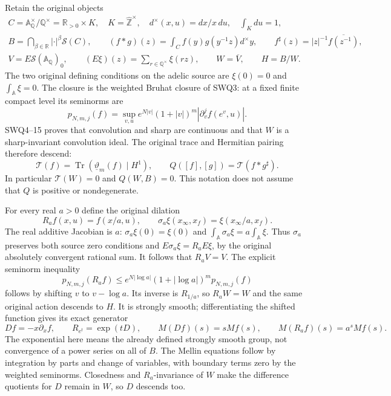 Retain the original objects
\begin{equation}\tag{GDT1}
 \begin{gathered}
 C=\mathbb A_{\mathbb Q}^{\times}/\mathbb Q^{\times}
   =\mathbb R_{>0}\times K,\quad K=\widehat{\mathbb Z}^{\times},
 \quad d^\times(x,u)=dx/x\,du,\quad\int_Kdu=1,\\
 B=\bigcap_{\beta\in\mathbb R}|\cdot|^\beta\mathcal S(C),\qquad
 (f*g)(z)=\int_C f(y)g(y^{-1}z)d^\times y,\qquad
 f^\sharp(z)=|z|^{-1}\overline{f(z^{-1})},\\
 V=E\mathcal S(\mathbb A_{\mathbb Q})_0,\qquad
 (E\xi)(z)=\sum_{r\in\mathbb Q^\times}\xi(rz),\qquad
 W=\overline V,\qquad H=B/W.
 \end{gathered}
\end{equation}
The two original defining conditions on the adelic source are
$\xi(0)=0$ and $\int_{\mathbb A}\xi=0$.
The closure is the weighted Bruhat closure of SWQ3: at a fixed
finite compact level its seminorms are
\[
 p_{N,m,j}(f)=\sup_{v,u}
 e^{N|v|}(1+|v|)^m
 |\partial_v^j f(e^v,u)|.
\]
SWQ4--15 proves that convolution and sharp are continuous and
that $W$ is a sharp-invariant convolution ideal.
The original trace and Hermitian pairing therefore descend:
\begin{equation}\tag{GDT2}
 \mathscr T(f)=\operatorname{Tr}(\underline\vartheta_m(f)\mid H^1),
 \qquad Q([f],[g])=\mathscr T(f*g^\sharp).
\end{equation}
In particular $\mathscr T(W)=0$ and $Q(W,B)=0$.
This notation does not assume that $Q$ is positive or nondegenerate.

For every real $a>0$ define the original dilation
\begin{equation}\tag{GDT3}
 R_a f(x,u)=f(x/a,u),\qquad
 \sigma_a\xi(x_\infty,x_f)=\xi(x_\infty/a,x_f).
\end{equation}
The real additive Jacobian is $a$:
$\sigma_a\xi(0)=\xi(0)$ and
$\int_{\mathbb A}\sigma_a\xi=a\int_{\mathbb A}\xi$.
Thus $\sigma_a$ preserves both source zero conditions and
$E\sigma_a\xi=R_aE\xi$, by the original absolutely convergent
rational sum. It follows that $R_aV=V$.
The explicit seminorm inequality
\[
 p_{N,m,j}(R_af)\le
 e^{N|\log a|}(1+|\log a|)^m p_{N,m,j}(f)
\]
follows by shifting $v$ to $v-\log a$. Its inverse is
$R_{1/a}$, so $R_aW=W$ and the same original action
descends to $H$. It is strongly smooth; differentiating
the shifted function gives its exact generator
\begin{equation}\tag{GDT4}
 Df=-x\partial_x f,\qquad
 R_{e^t}=\exp(tD),\qquad
 M(Df)(s)=sMf(s),\qquad M(R_af)(s)=a^sMf(s).
\end{equation}
The exponential here means the already defined strongly smooth
group, not convergence of a power series on all of $B$.
The Mellin equations follow by integration by parts and change
of variables, with boundary terms zero by the weighted
seminorms. Closedness and $R_a$-invariance of $W$ make the
difference quotients for $D$ remain in $W$, so $D$ descends too.

